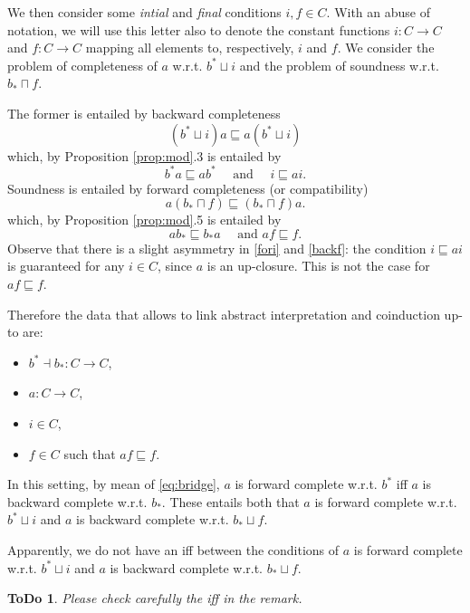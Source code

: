 \documentclass[smallcondensed,envcountsect,envcountsame]{svjour3}     %
\newtheorem{todo}[theorem]{\bf ToDo}
\begin{document}
We then consider some \emph{intial} and \emph{final} conditions $i,f\in C$. With an abuse of notation, we will use this letter also to denote the constant functions $i\colon C\to C$ and $f\colon C\to C$ mapping all elements to, respectively, $i$ and $f$.
We consider the problem of completeness of $a$ w.r.t. $b^*\sqcup i$ and the problem of soundness w.r.t. $b_*\sqcap f$.

The former is entailed by backward completeness
$$(b^* \sqcup i) a \sqsubseteq a (b^* \sqcup i)$$
which, by Proposition \ref{prop:mod}.3 is entailed by 
\begin{equation}\label{fori}
b^*a \sqsubseteq a b^*  \quad \text{ and } \quad i \sqsubseteq ai \text{.}\end{equation}
Soundness is entailed by forward completeness (or compatibility)
$$
a(b_*\sqcap f) \sqsubseteq (b_* \sqcap f) a \text{.}
$$
which, by Proposition \ref{prop:mod}.5 is entailed by 
\begin{equation}\label{backf}
ab_* \sqsubseteq b_*  a \quad \text{ and } af \sqsubseteq f \text{.}
\end{equation}
Observe that there is a slight asymmetry in \eqref{fori} and \eqref{backf}: the condition $i \sqsubseteq ai $ is guaranteed for any $i\in C$, since $a$ is an up-closure. This is not the case for $af \sqsubseteq f $.

Therefore the data that allows to link abstract interpretation and coinduction up-to are:
\begin{itemize}
\item $b^*\dashv b_* \colon C\to C$,
\item $a\colon C \to C$,
\item $i\in C$,
\item $f\in C$ such that $af \sqsubseteq f$.
\end{itemize}
In this setting, by mean of \eqref{eq:bridge}, $a$ is forward complete w.r.t. $b^*$ iff  $a$ is backward complete w.r.t. $b_*$. These entails both that 
$a$ is forward complete w.r.t. $b^*\sqcup i $ and $a$ is backward complete w.r.t. $b_* \sqcup f$.

\begin{remark}
Apparently, we do not have an iff between the conditions of $a$ is forward complete w.r.t. $b^*\sqcup i $ and $a$ is backward complete w.r.t. $b_* \sqcup f$.
\end{remark}
\begin{todo}
Please check carefully the iff in the remark.
\end{todo}
\end{document}
